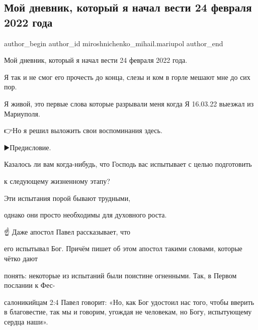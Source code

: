  
 
 
 
 

\subsection{Мой дневник, который я начал вести 24 февраля 2022 года}
\label{sec:24_02_2023.fb.miroshnichenko_mihail.mariupol.1.moi_dnevnik__kotorii}

\ifcmt
 author_begin
   author_id miroshnichenko_mihail.mariupol
 author_end
\fi

Мой дневник, который я начал вести 24 февраля 2022 года.

Я так и не смог его прочесть до конца, слезы и ком в горле мешают мне до сих
пор.

Я живой, это первые слова которые разрывали меня когда Я 16.03.22 выезжал из
Мариуполя.

👉Но я решил выложить свои воспоминания здесь.

▶️Предисловие.

Казалось ли вам когда-нибудь, что Господь вас испытывает с целью подготовить 

к следующему жизненному этапу? 

 Эти испытания порой бывают трудными, 

однако они просто необходимы для духовного роста.

☝️ Даже апостол Павел рассказывает, что 

его испытывал Бог. Причём пишет об этом апостол такими словами, которые чётко
дают 

понять: некоторые из испытаний были поистине огненными. Так, в Первом послании
к Фес-

салоникийцам 2:4 Павел говорит: «Но, как Бог удостоил нас того, чтобы вверить в
благовестие, так мы и говорим, угождая не человекам, но Богу, испытующему
сердца наши». 

